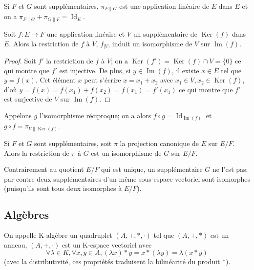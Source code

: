 \begin{prop}
Si $F$ et $G$ sont supplémentaires, $\pi_{F\parallel G}$ est une application linéaire de $E$ dans $E$ et on a $\pi_{F\parallel G} + \pi_{G\parallel F} = \operatorname{Id}_E$.
\end{prop}

\begin{thm}
Soit $f : E \to F$ une application linéaire et $V$ un supplémentaire de $\operatorname{Ker}(f)$ dans $E$. Alors la restriction de $f$ à $V$, $f_{|V}$, induit un isomorphisme de $V$ sur $\operatorname{Im}(f)$.
\end{thm}

\begin{proof}
Soit $f'$ la restriction de $f$ à $V$; on a $\operatorname{Ker}(f') = \operatorname{Ker}(f) \cap V = \{0\}$ ce qui montre que $f'$ est injective. De plus, si $y \in \operatorname{Im}(f)$, il existe $x \in E$ tel que $y = f(x)$. Cet élément $x$ peut s'écrire $x = x_1 + x_2$ avec $x_1 \in V, x_2 \in \operatorname{Ker}(f)$, d'où $y = f(x) = f(x_1) + f(x_2) = f(x_1) = f'(x_1)$ ce qui montre que $f'$ est surjective de $V$ sur $\operatorname{Im}(f)$.
\end{proof}

\begin{rem}
Appelons $g$ l'isomorphisme réciproque; on a alors $f \circ g = \operatorname{Id}_{\operatorname{Im}(f)}$ et $g \circ f = \pi_{V\parallel \operatorname{Ker}(f)}$.
\end{rem}

\begin{prop}
Si $F$ et $G$ sont supplémentaires, soit $\pi$ la projection canonique de $E$ sur $E/F$. Alors la restriction de $\pi$ à $G$ est un isomorphisme de $G$ sur $E/F$.
\end{prop}

\begin{rem}
Contrairement au quotient $E/F$ qui est unique, un supplémentaire $G$ ne l'est pas; par contre deux supplémentaires d'un même sous-espace vectoriel sont isomorphes (puisqu'ils sont tous deux isomorphes à $E/F$).
\end{rem}

\subsection{Algèbres}

\begin{de}
On appelle K-algèbre un quadruplet $(A,+,*,\cdot)$ tel que $(A,+,*)$ est un anneau, $(A,+,\cdot)$ est un K-espace vectoriel avec
\[ \forall \lambda \in K, \forall x,y \in A, (\lambda x) * y = x * (\lambda y) = \lambda(x * y) \]
(avec la distributivité, ces propriétés traduisent la bilinéarité du produit $*$).
\end{de}


